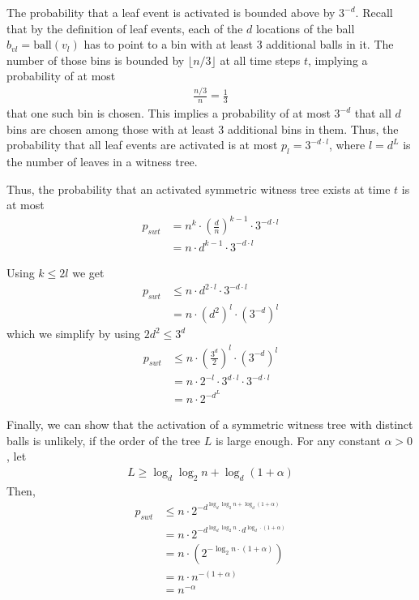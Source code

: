 \documentclass[a4paper,12pt]{article}
\begin{document}
The probability that a leaf event is activated is bounded above by $3^{-d}$. Recall that by the definition of leaf events, each of the $d$ locations of the ball $b_{vl} = \mathrm{ball}(v_l)$ has to point to a bin with at least 3 additional balls in it. The number of those bins is bounded by $\lfloor n/3 \rfloor$ at all time steps $t$, implying a probability of at most 
\begin{align}
\frac{n/3}{n} = \frac{1}{3}
\end{align}
that one such bin is chosen. This implies a probability of at most $3^{-d}$ that all $d$ bins are chosen among those with at least 3 additional bins in them. Thus, the probability that all leaf events are activated is at most $p_l = 3^{-d\cdot l}$, where $l = d^{L}$ is the number of leaves in a witness tree.

Thus, the probability that an activated symmetric witness tree exists at time $t$ is at most 
\begin{align}
p_{swt} &= n^{k} \cdot \left(\frac{d}{n}\right)^{k-1} \cdot 3^{-d \cdot l} \\
		&= n \cdot d^{k-1} \cdot 3^{-d \cdot l}
\end{align}

Using $k \leq 2l$ we get
\begin{align}
p_{swt} &\leq n \cdot d^{2\cdot l} \cdot 3^{-d \cdot l} \\
		&= n \cdot \left(d^2\right)^l \cdot \left( 3^{-d} \right)^l
\end{align}
which we simplify by using $2d^2 \leq 3^d$
\begin{align}
p_{swt} &\leq n \cdot \left(\frac{3^d}{2}\right)^l \cdot \left( 3^{-d}\right)^l \\
		&= n \cdot 2^{-l} \cdot 3^{d\cdot l} \cdot 3^{-d \cdot l} \\
		&= n\cdot 2^{-d^L}		
\end{align}

Finally, we can show that the activation of a symmetric witness tree with distinct balls is unlikely, if the order of the tree $L$ is large enough. For any constant $\alpha > 0 $, let
\begin{align}
L \geq \log_d\log_2 n + \log_d\left(1+\alpha\right)
\end{align}
Then, 
\begin{align}
p_{swt} &\leq n \cdot 2^{{-d}^{\log_d\log_2 n + \log_d\left(1+\alpha\right)}} \\
		&= n \cdot 2^{-{d}^{\log_d\log_2 n}\cdot d^{\log_d \cdot\left(1+\alpha\right)}} \\
		&= n \cdot \left( 2^{-\log_2 n \cdot \left(1+ \alpha \right)} \right) \\
		&= n \cdot n^{-\left(1+\alpha\right)} \\
		&= n^{-\alpha}
\end{align}
\end{document}
